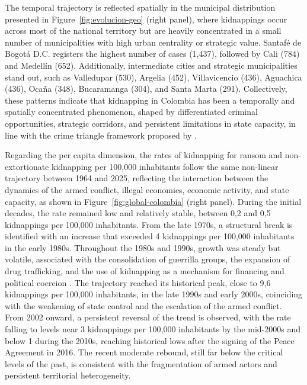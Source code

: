 \documentclass[ecta,nameyear,draft]{econsocart}
\theoremstyle{plain}
\theoremstyle{definition}
\newcommand{\1}{\mathbf{1}}
\begin{document}
The temporal trajectory is reflected spatially in the municipal distribution presented in Figure~\ref{fig:evolucion-geo} (right panel), where kidnappings occur across most of the national territory but are heavily concentrated in a small number of municipalities with high urban centrality or strategic value. Santafé de Bogotá D.C. registers the highest number of cases (1,437), followed by Cali (784) and Medellín (652). Additionally, intermediate cities and strategic municipalities stand out, such as Valledupar (530), Argelia (452), Villavicencio (436), Aguachica (436), Ocaña (348), Bucaramanga (304), and Santa Marta (291). Collectively, these patterns indicate that kidnapping in Colombia has been a temporally and spatially concentrated phenomenon, shaped by differentiated criminal opportunities, strategic corridors, and persistent limitations in state capacity, in line with the crime triangle framework proposed by \citet{Pires2014}.

Regarding the per capita dimension, the rates of kidnapping for ransom and non-extortionate kidnapping per 100,000 inhabitants follow the same non-linear trajectory between 1964 and 2025, reflecting the interaction between the dynamics of the armed conflict, illegal economies, economic activity, and state capacity, as shown in Figure~\ref{fig:global-colombia} (right panel). During the initial decades, the rate remained low and relatively stable, between 0{,}2 and 0{,}5 kidnappings per 100,000 inhabitants. From the late 1970s, a structural break is identified with an increase that exceeded 4 kidnappings per 100,000 inhabitants in the early 1980s. Throughout the 1980s and 1990s, growth was steady but volatile, associated with the consolidation of guerrilla groups, the expansion of drug trafficking, and the use of kidnapping as a mechanism for financing and political coercion \citet{Zarate2007}. The trajectory reached its historical peak, close to 9{,}6 kidnappings per 100,000 inhabitants, in the late 1990s and early 2000s, coinciding with the weakening of state control and the escalation of the armed conflict. From 2002 onward, a persistent reversal of the trend is observed, with the rate falling to levels near 3 kidnappings per 100,000 inhabitants by the mid-2000s and below 1 during the 2010s, reaching historical lows after the signing of the Peace Agreement in 2016. The recent moderate rebound, still far below the critical levels of the past, is consistent with the fragmentation of armed actors and persistent territorial heterogeneity.
\end{document}
